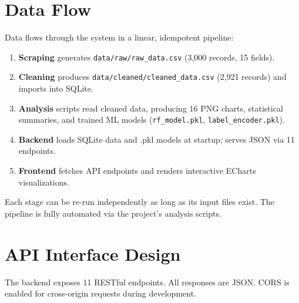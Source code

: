 \documentclass[12pt,a4paper]{report}
\begin{document}
\section{Data Flow}

Data flows through the system in a linear, idempotent pipeline:

\begin{enumerate}[itemsep=3pt]
  \item \textbf{Scraping} generates \texttt{data/raw/raw\_data.csv} (3,000 records, 15 fields).
  \item \textbf{Cleaning} produces \texttt{data/cleaned/cleaned\_data.csv} (2,921 records) and imports into SQLite.
  \item \textbf{Analysis} scripts read cleaned data, producing 16 PNG charts, statistical summaries, and trained ML models (\texttt{rf\_model.pkl}, \texttt{label\_encoder.pkl}).
  \item \textbf{Backend} loads SQLite data and .pkl models at startup; serves JSON via 11 endpoints.
  \item \textbf{Frontend} fetches API endpoints and renders interactive ECharts visualizations.
\end{enumerate}

Each stage can be re-run independently as long as its input files exist. The pipeline is fully automated via the project's analysis scripts.

\section{API Interface Design}

The backend exposes 11 RESTful endpoints. All responses are JSON. CORS is enabled for cross-origin requests during development.
\end{document}
